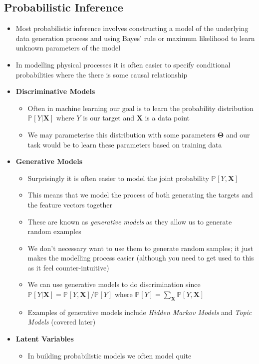 \documentclass[11pt]{article}
\newcommand{\Prob}[2][]{\mathbb{P}_{#1\!}\left[ #2 \right]}
\begin{document}
\subsection{Probabilistic Inference}
\label{sec:org8b29124}
\begin{itemize}
\item Most probabilistic inference involves constructing a model of the
underlying data generation process and using Bayes' rule or
maximum likelihood to learn unknown parameters of the model
\item In modelling physical processes it is often easier to specify
conditional probabilities where the there is some causal relationship
\item \textbf{Discriminative Models}
\begin{itemize}
\item Often in machine learning our goal is to learn the probability
distribution \(\Prob{Y|\bm{X}}\) where \(Y\) is our target and
\(\bm{X}\) is a data point
\item We may parameterise this distribution with some
parameters \(\bm{\Theta}\) and our task would be to learn these
parameters based on training data
\end{itemize}
\item \textbf{Generative Models}
\begin{itemize}
\item Surprisingly it is  often easier to model the joint probability
\(\Prob{Y,\bm{X}}\)
\item This means that we model the process of both generating the
targets and the feature vectors together
\item These are known as \emph{generative models} as they allow us to
generate random examples
\item We don't necessary want to use them to generate random samples;
it just makes the modelling process easier (although you need
to get used to this as it feel counter-intuitive)
\item We can use generative models to do discrimination since
\(\Prob{Y|\bm{X}} = \Prob{Y,\bm{X}}/\Prob{Y}\) where
\(\Prob{Y}=\sum_{\bm{X}} \Prob{Y,\bm{X}}\)
\item Examples of generative models include \emph{Hidden Markov Models}
and \emph{Topic Models} (covered later)
\end{itemize}
\item \textbf{Latent Variables}
\begin{itemize}
\item In building probabilistic models we often model quite

\end{itemize}
\end{itemize}
\end{document}
